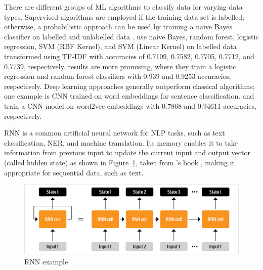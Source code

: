 There are different groups of \ac{ML} algorithms to classify data for varying data types. Supervised
algorithms are employed if the training data set is labelled; otherwise, a probabilistic approach
can be used by training a naive Bayes classifier on labelled and unlabelled data
\cite{liDisasterResponseAided2018}.  use naive Bayes,
random forest, logistic regression, \ac{SVM} (RBF Kernel), and \ac{SVM} (Linear Kernel) on labelled
data transformed using \ac{TF-IDF} with accuracies of 0.7109, 0.7582, 0.7705, 0.7712, and 0.7739,
respectively.  results are more promising,
where they train a logistic regression and random forest classifiers with 0.939 and 0.9253
accuracies, respectively. Deep learning approaches generally outperform classical algorithms; one
example is \ac{CNN} trained on word embeddings for sentence classification.
 and
 train a \ac{CNN} model on word2vec
embeddings with 0.7868 and 0.94611 accuracies, respectively.

\ac{RNN} \cite{hopfieldNeuralNetworksPhysical1982} is a common artificial neural network for
\ac{NLP} tasks, such as text classification, \ac{NER}, and machine translation. Its memory enables
it to take information from previous input to update the current input and output vector (called
hidden state) as shown in Figure~\ref{fig:rnn_example}, taken from
\citeauthor{tunstallNaturalLanguageProcessing2022}'s book
\cite{tunstallNaturalLanguageProcessing2022}, making it appropriate for sequential data, such as
text. 

\begin{figure}[H]
\begin{center}
  \includegraphics[width=12cm,trim={0.1cm 0.1cm 0.1cm 0.1cm},clip]{./images/unrolling_rnn.png}
\end{center}
\caption{RNN example \cite{tunstallNaturalLanguageProcessing2022}}
\label{fig:rnn_example}
\end{figure}

